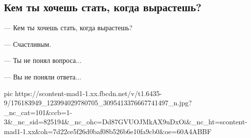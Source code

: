  
 
 
 
 

\subsection{Кем ты хочешь стать, когда вырастешь?}

— Кем ты хочешь стать, когда вырастешь?

— Счастливым.

— Ты не понял вопроса...

— Вы не поняли ответа...


\ifcmt
  pic https://scontent-mad1-1.xx.fbcdn.net/v/t1.6435-9/176183949_123994029780705_3095413376667741497_n.jpg?_nc_cat=101&ccb=1-3&_nc_sid=825194&_nc_ohc=Dd87GVUOJMkAX9uDxOi&_nc_ht=scontent-mad1-1.xx&oh=7d22ce5f26d0baf08b526b6e10fa9cb0&oe=60A4ABBF
\fi

